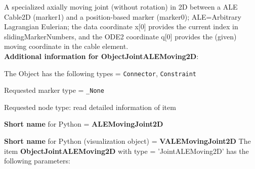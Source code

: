 \label{sec:item:ObjectJointALEMoving2D}
A specialized axially moving joint (without rotation) in 2D between a ALE Cable2D (marker1) and a position-based marker (marker0); ALE=Arbitrary Lagrangian Eulerian; the data coordinate x[0] provides the current index in slidingMarkerNumbers, and the ODE2 coordinate q[0] provides the (given) moving coordinate in the cable element.\vspace{12pt}
 \\{\bf Additional information for ObjectJointALEMoving2D}:
\bi
  \item The Object has the following types = \texttt{Connector}, \texttt{Constraint}
  \item Requested marker type = \texttt{\_None}
  \item Requested node type: read detailed information of item
  \item {\bf Short name} for Python = {\bf ALEMovingJoint2D}  \item {\bf Short name} for Python (visualization object) = {\bf VALEMovingJoint2D}\ei
\vspace{12pt} \noindent The item {\bf ObjectJointALEMoving2D} with type = 'JointALEMoving2D' has the following parameters:\vspace{-1cm}\\ 
